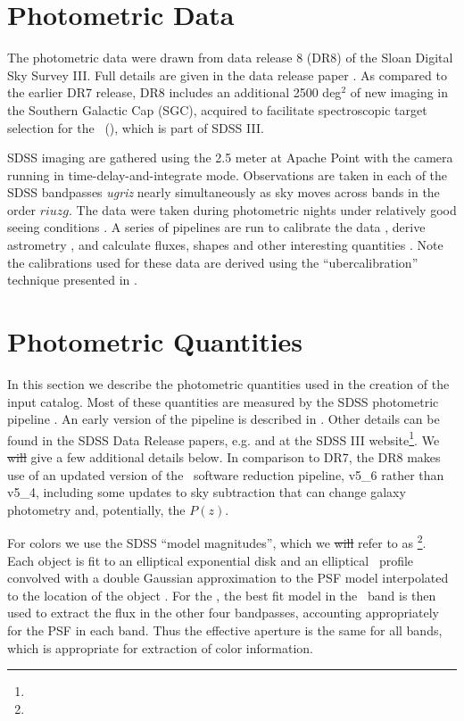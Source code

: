 \documentclass[preprint]{aastex}
\begin{document}
\section{Photometric Data} \label{sec:data}

The photometric data were drawn from data release 8 (DR8) of the Sloan Digital
Sky Survey III.  Full details are given in the data release paper \citet{dr8}.
As compared to the earlier DR7 release, DR8 includes an additional 2500 deg$^2$
of new imaging in the Southern Galactic Cap (SGC), acquired to facilitate
spectroscopic target selection for the \bossfull\ (\boss), which is part of
SDSS III.


SDSS imaging are gathered using the 2.5 meter at Apache Point \citep{Gunn06}
with the camera \citep{Gunn98} running in time-delay-and-integrate mode.
Observations are taken in each of the SDSS bandpasses {\it ugriz} nearly
simultaneously as sky moves across bands in the order $riuzg$.  The data were taken
during photometric nights under relatively good seeing conditions
\citep{Hogg01}.  A series of pipelines are run to calibrate the data
\citep{Nikhil08,Smith02,Tucker06}, derive astrometry \citep{Pier03}, and
calculate fluxes, shapes and other interesting quantities
\citep{LuptonADASS01}.  
Note the calibrations used for these data are derived using the ``ubercalibration''
technique presented in \citet{Nikhil08}.  
\section{Photometric Quantities} \label{sec:photo}

In this section we describe the photometric quantities used in the creation of the
input catalog.  Most of these quantities are measured by the SDSS photometric
pipeline \photo. An early version of the pipeline is described in
\citet{LuptonADASS01}.  Other details can be found in the SDSS Data Release
papers, e.g. \citet{dr4} and at the SDSS III website\footnote{\sdssweb}.  We
\sout{will} give a few additional details below.  In comparison to DR7, the DR8
makes use of an updated version of the \photo\ software reduction pipeline,
v5\_6 rather than v5\_4, including some updates to sky subtraction that can
change galaxy photometry and, potentially, the $P(z)$.

For colors we use the SDSS ``model magnitudes'', which we \sout{will} refer to as
\modelmag \footnote{\DRatemags}.  Each object is fit to an elliptical
exponential disk and an elliptical \devauc\ profile convolved with a double
Gaussian approximation to the PSF model interpolated to the location of the
object \citep{LuptonADASS01,Sheldon04}.  For the \modelmag, the best fit model
in the \rmag\ band is then used to extract the flux in the other four
bandpasses, accounting appropriately for the PSF in each band. Thus the
effective aperture is the same for all bands, which is appropriate for
extraction of color information.
\end{document}
